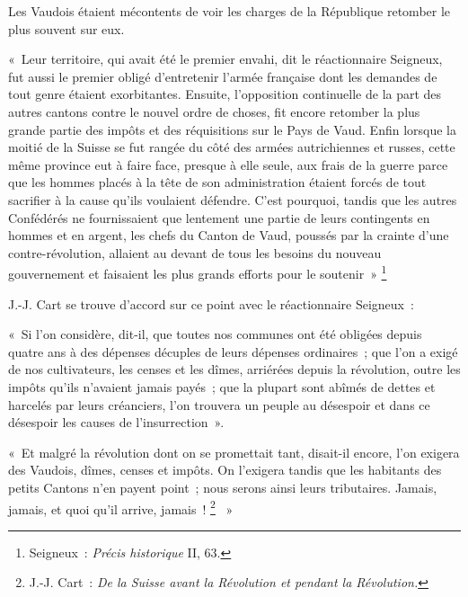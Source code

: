 \documentclass[french,twoside]{book} %
\newenvironment{quoteblock}%
  {\begin{quoting}}
  {\end{quoting}}
\newenvironment{quotebar}{%
    \def\FrameCommand{{\color{rubric!10!}\vrule width 0.5em} \hspace{0.9em}}%
    \def\OuterFrameSep{\itemsep} %
    \MakeFramed {\advance\hsize-\width \FrameRestore}
  }%
  {%
    \endMakeFramed
  }
\renewenvironment{quoteblock}%
  {%
    \savenotes
    \setstretch{0.9}
    \normalfont
    \begin{quotebar}
  }
  {%
    \end{quotebar}
    \spewnotes
  }
\begin{document}
\noindent Les Vaudois étaient mécontents de voir les charges de la République retomber le plus souvent sur eux.\par

\begin{quoteblock}
 \noindent « Leur territoire, qui avait été le premier envahi, dit le réactionnaire Seigneux, fut aussi le premier obligé d’entretenir l’armée française dont les demandes de tout genre étaient exorbitantes. Ensuite, l’opposition continuelle de la part des autres cantons contre le nouvel ordre de choses, fit encore retomber la plus grande partie des impôts et des réquisitions sur le Pays de Vaud. Enfin lorsque la moitié de la Suisse se fut rangée du côté des armées autrichiennes et russes, cette même province eut à faire face, presque à elle seule, aux frais de la guerre parce que les hommes placés à la tête de son administration étaient forcés de tout sacrifier à la cause qu’ils voulaient défendre. C’est pourquoi, tandis que les autres Confédérés ne fournissaient que lentement une partie de leurs contingents en hommes et en argent, les chefs du Canton de Vaud, poussés par la crainte d’une contre-révolution, allaient au devant de tous les besoins du nouveau gouvernement et faisaient les plus grands efforts pour le soutenir » \footnote{Seigneux : \emph{Précis historique} II, 63.} 
 \end{quoteblock}

\noindent J.-J. Cart se trouve d’accord sur ce point avec le réactionnaire Seigneux :\par

\begin{quoteblock}
 \noindent « Si l’on considère, dit-il, que toutes nos communes ont été obligées depuis quatre ans à des dépenses décuples de leurs dépenses ordinaires ; que l’on a exigé de nos cultivateurs, les censes et les dîmes, arriérées depuis la révolution, outre les impôts qu’ils n’avaient jamais payés ; que la plupart sont abîmés de dettes et harcelés par leurs créanciers, l’on trouvera un peuple au désespoir et dans ce désespoir les causes de l’insurrection ».\par
 « Et malgré la révolution dont on se promettait tant, disait-il encore, l’on exigera des Vaudois, dîmes, censes et impôts. On l’exigera tandis que les habitants des petits Cantons n’en payent point ; nous serons ainsi leurs tributaires. Jamais, jamais, et quoi qu’il arrive, jamais ! \footnote{J.-J. Cart : \emph{De la Suisse avant la Révolution et pendant la Révolution.}}  »
 \end{quoteblock}
\end{document}
